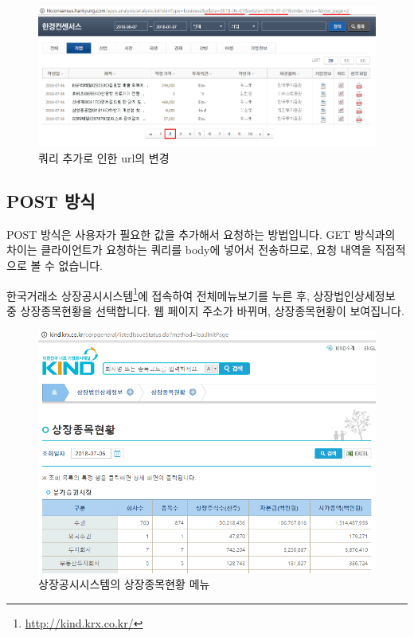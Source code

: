 \documentclass[]{book}
\let\rmarkdownfootnote\footnote%
\def\footnote{\protect\rmarkdownfootnote}
\begin{document}
\begin{figure}

{\centering \includegraphics[width=1\linewidth]{images/crawl_hk2} 

}

\caption{쿼리 추가로 인한 url의 변경}\label{fig:unnamed-chunk-3}
\end{figure}

\hypertarget{post-}{%
\subsection{POST 방식}\label{post-}}

POST 방식은 사용자가 필요한 값을 추가해서 요청하는 방법입니다. GET 방식과의 차이는 클라이언트가 요청하는 쿼리를 body에 넣어서 전송하므로, 요청 내역을 직접적으로 볼 수 없습니다.

한국거래소 상장공시시스템\footnote{\url{http://kind.krx.co.kr/}}에 접속하여 전체메뉴보기를 누른 후, 상장법인상세정보 중 상장종목현황을 선택합니다. 웹 페이지 주소가 바뀌며, 상장종목현황이 보여집니다.

\begin{figure}

{\centering \includegraphics{images/crawl_corp_list} 

}

\caption{상장공시시스템의 상장종목현황 메뉴}\label{fig:unnamed-chunk-4}
\end{figure}
\end{document}
